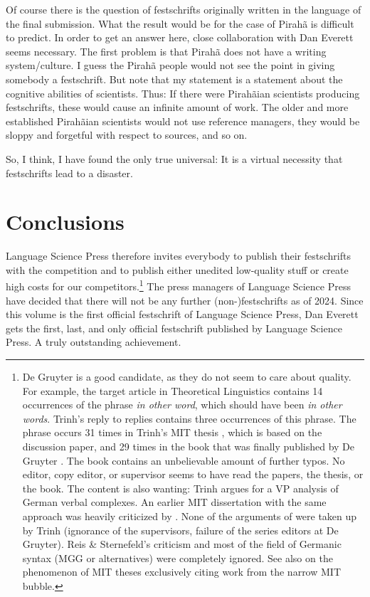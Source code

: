 \documentclass[output=paper,colorlinks,citecolor=brown]{langscibook}
\begin{document}
Of course there is the question of festschrifts originally written in the language of the final
submission. What the result would be for the case of Pirahã is difficult to predict. In order to get
an answer here, close collaboration with Dan Everett seems necessary. The first problem is that
Pirahã does not have a writing system/culture. I guess the Pirahã people would not see the point in giving
somebody a festschrift. But note that my statement is a statement about the cognitive abilities of
scientists. Thus: If there were Pirahãian scientists producing festschrifts, these would cause an
infinite amount of work. The older and more established Pirahãian scientists would not use reference
managers, they would be sloppy and forgetful with respect to sources, and so on.

So, I think, I have found the only true universal: It is a virtual necessity that fest\-schrifts lead to a
disaster.

\section{Conclusions}

Language Science Press therefore invites everybody to publish their festschrifts with the
competition and to publish either unedited low-quality stuff or create high
costs for our competitors.\footnote{
  De Gruyter is a good candidate, as they do not seem to care about quality. For example, the target article
  \citet{Trinh2009a-u} in Theoretical Linguistics contains 14 occurrences of the phrase \emph{in
    other word}, which should have been \emph{in other words}. Trinh's reply to replies
  \citeyearpar{Trinh2010a-u} contains three occurrences of this phrase. The phrase occurs 31 times in
  Trinh's MIT thesis \citeyearpar{Trinh2011a}, which is based on the discussion paper, and 29 times in the book that was finally published by De Gruyter
  \citep{Trinh2019a}. The book contains an unbelievable amount of further typos. No editor, copy editor, or
  supervisor seems to have read the papers, the thesis, or the book. The content is also wanting:
  Trinh argues for a VP analysis of German verbal complexes. An earlier MIT dissertation with the
  same approach was heavily criticized by \citet{ReisSternefeld2004}. None of the arguments of \citeauthor{ReisSternefeld2004} were taken up by Trinh (ignorance of the supervisors, failure of the series editors
  at De Gruyter). Reis \& Sternefeld's criticism and most of the field of Germanic syntax
  (MGG or alternatives) were completely ignored. See also \citet[]{ReisSternefeld2004} on
  the phenomenon of MIT theses exclusively citing work from the narrow MIT bubble.
}
The press managers of Language Science Press have decided that there will not be any further
(non-)festschrifts as of 2024. Since this volume is the first official festschrift of Language
Science Press, Dan Everett gets the first, last, and only official festschrift published by Language
Science Press. A truly outstanding achievement. 
\end{document}
